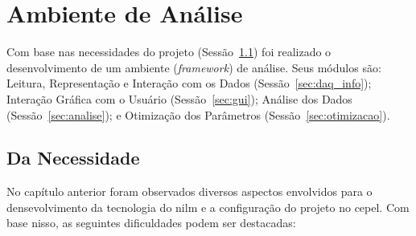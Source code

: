 \chapter{Ambiente de Análise}
\label{chap:framework}

Com base nas necessidades do projeto
(Sessão~\ref{sec:motivacao_framework}) foi realizado o desenvolvimento
de um ambiente (\emph{framework}) de análise. Seus módulos são:
Leitura, Representação e Interação com os Dados
(Sessão~\ref{sec:daq_info}); Interação Gráfica com o Usuário
(Sessão~\ref{sec:gui}); Análise dos Dados (Sessão~\ref{sec:analise});
e Otimização dos Parâmetros (Sessão~\ref{sec:otimizacao}).


\section{Da Necessidade}
\label{sec:motivacao_framework}

No capítulo anterior foram observados diversos aspectos envolvidos
para o densevolvimento da tecnologia do \gls{nilm} e a configuração do
projeto no \gls{cepel}. Com base nisso, as seguintes dificuldades
podem ser destacadas:


